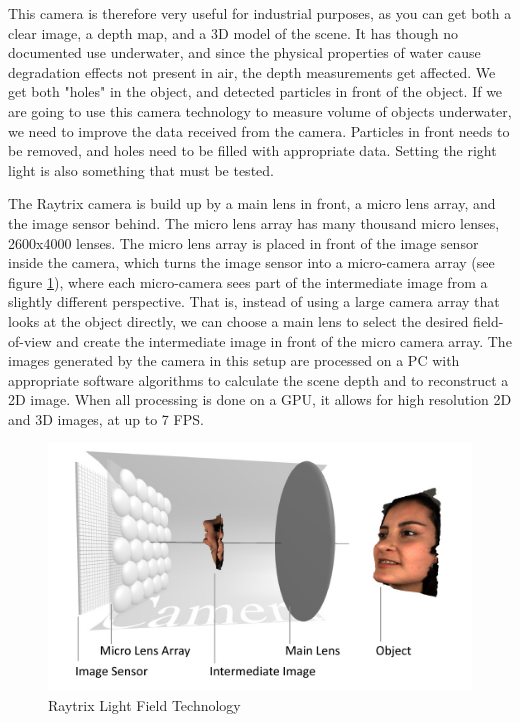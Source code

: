 This camera is therefore very useful for industrial purposes, as you can get both a clear image, a depth map, and a 3D model of the scene. It has though no documented use underwater, and since the physical properties of water cause degradation effects not present in air, the depth measurements get affected. We get both "holes" in the object, and detected particles in front of the object. If we are going to use this camera technology to measure volume of objects underwater, we need to improve the data received from the camera. Particles in front needs to be removed, and holes need to be filled with appropriate data. Setting the right light is also something that must be tested. 

The Raytrix camera is build up by a main lens in front, a micro lens array, and the image sensor behind. The micro lens array has many thousand micro lenses, 2600x4000 lenses. The micro lens array is placed in front of the image sensor inside the camera, which turns the image sensor into a micro-camera array (see figure \ref{fig:light_field}), where each micro-camera sees part of the intermediate image from a slightly different perspective. That is, instead of using a large camera array that looks at the object directly, we can choose a main lens to select the desired field-of-view and create the intermediate image in front of the micro camera array. The images generated by the camera in this setup are processed on a PC with appropriate software algorithms to calculate the scene depth and to reconstruct a 2D image. When all processing is done on a GPU, it allows for high resolution 2D and 3D images, at up to 7 FPS. \cite{website:raytrix_technology}

\begin{figure}[h]
    \centering
    \includegraphics[width=.9\linewidth]{images/hardware/Light-Field-Camera-Schematic}
    \caption{Raytrix Light Field Technology}
    \label{fig:light_field}
\end{figure}

